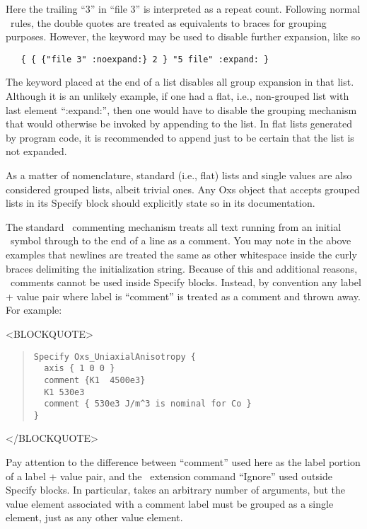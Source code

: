 Here the trailing ``3'' in ``file 3'' is interpreted as a repeat count.
Following normal \Tcl\ rules, the double quotes are treated as equivalents
to braces for grouping purposes.  However, the keyword 
may be used to disable further expansion, like so
\begin{verbatim}
   { { {"file 3" :noexpand:} 2 } "5 file" :expand: }
\end{verbatim}
The  keyword placed at the end of a list disables all
group expansion in that list.  Although it is an unlikely example,
if one had a flat, i.e., non-grouped list with last element ``:expand:'',
then one would have to disable the grouping mechanism that would
otherwise be invoked by appending  to the list.  In
flat lists generated by program code, it is recommended to append
 just to be certain that the list is not expanded.

As a matter of nomenclature, standard (i.e., flat) lists and single
values are also considered grouped lists, albeit trivial ones.  Any Oxs
object that accepts grouped lists in its Specify block should explicitly
state so in its documentation.

%
\label{par:specifyComments}
The standard \Tcl\ commenting mechanism treats all text running from an
initial \lb\ symbol through to the end of a line as a comment.  You may
note in the above examples that newlines are treated the same as
other whitespace inside the curly braces delimiting the 
initialization string.  Because of this and additional reasons, \Tcl\
comments cannot be used inside Specify blocks.  Instead, by
convention any label + value pair where label is ``comment'' is treated
as a comment and thrown away.  For example:
\begin{rawhtml}
<BLOCKQUOTE>
\end{rawhtml}
\begin{quote}
\begin{verbatim}
Specify Oxs_UniaxialAnisotropy {
  axis { 1 0 0 }
  comment {K1  4500e3}
  K1 530e3
  comment { 530e3 J/m^3 is nominal for Co }
}
\end{verbatim}
\end{quote}
\begin{rawhtml}
</BLOCKQUOTE>
\end{rawhtml}
Pay attention to the difference between ``comment'' used here as the
label portion of a label + value pair, and the \MIF\ extension command
``Ignore'' used outside Specify blocks.  In particular, \cd{Ignore}
takes an arbitrary number of arguments, but the value element associated
with a comment label must be grouped as a single element, just as any
other value element.

